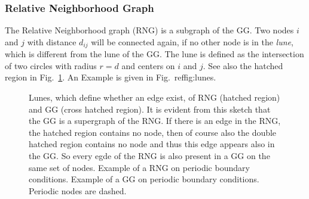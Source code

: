     \subsubsection{Relative Neighborhood Graph}
        The Relative Neighborhood
        graph (RNG) \cite{Toussaint1980} is a subgraph of the GG. Two nodes \(i\) and \(j\) with
        distance \(d_{ij}\) will be connected again, if no other node is in the
        \emph{lune}, which is different from the lune of the GG. The lune
        is defined as the intersection of two
        circles with radius \(r = d\) and centers on \(i\) and \(j\).
        See also the hatched region in Fig.\ \ref{fig:lunes}. An Example is
        given in Fig.\ ref{fig:lunes}.

    \begin{figure}[htbp]
        \centering
        \caption[Gabriel - and Relative Neighborhood Graph]
        {
             Lunes, which define whether an edge
                exist, of RNG (hatched region) and GG (cross hatched region).
                It is evident from this sketch that the GG is a supergraph
                of the RNG. If there is an edge in the RNG, the hatched
                region contains no node, then of course also the double
                hatched region contains no node and thus this edge appears
                also in the GG. So every egde of the RNG is also present
                in a GG on the same set of nodes.
             Example of a RNG on periodic
                boundary conditions.
             Example of a GG on
                periodic boundary conditions. Periodic nodes are dashed.
        }
        \label{fig:lunes}
    \end{figure}

